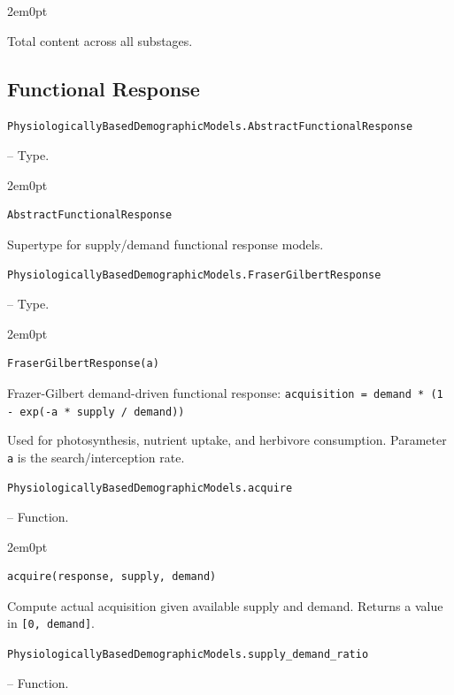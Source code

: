 \begin{adjustwidth}{2em}{0pt}

Total content across all substages.



\end{adjustwidth}

\subsection{Functional Response}



\label{17165189580673832056}{}

\hypertarget{5808281560440734622}{\texttt{PhysiologicallyBasedDemographicModels.AbstractFunctionalResponse}}  -- {Type.}

\begin{adjustwidth}{2em}{0pt}


\begin{verbatim}
AbstractFunctionalResponse
\end{verbatim}

Supertype for supply/demand functional response models.



\end{adjustwidth}
\hypertarget{16590599905217700295}{\texttt{PhysiologicallyBasedDemographicModels.FraserGilbertResponse}}  -- {Type.}

\begin{adjustwidth}{2em}{0pt}


\begin{verbatim}
FraserGilbertResponse(a)
\end{verbatim}

Frazer-Gilbert demand-driven functional response: \texttt{acquisition = demand * (1 - exp(-a * supply / demand))}

Used for photosynthesis, nutrient uptake, and herbivore consumption. Parameter \texttt{a} is the search/interception rate.



\end{adjustwidth}
\hypertarget{5041275103098413532}{\texttt{PhysiologicallyBasedDemographicModels.acquire}}  -- {Function.}

\begin{adjustwidth}{2em}{0pt}


\begin{verbatim}
acquire(response, supply, demand)
\end{verbatim}

Compute actual acquisition given available supply and demand. Returns a value in \texttt{[0, demand]}.



\end{adjustwidth}
\hypertarget{9964307941852915127}{\texttt{PhysiologicallyBasedDemographicModels.supply\_demand\_ratio}}  -- {Function.}

